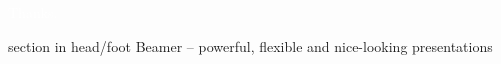\documentclass[aspectratio=1610,utf8]{beamer}
\begin{document}
\addtocounter{framenumber}{-1}


\begin{frame}[plain, b]
  \transsplithorizontalout
  \centering
  \LARGE \textcolor{white}{Thanks.}
  \normalsize

  \vspace*{\fill}

  \begin{beamercolorbox}[wd=\paperwidth]{section in head/foot}
    \centering
    \vskip3pt
    {\small Beamer -- powerful, flexible and nice-looking presentations}
    \vskip8pt
  \end{beamercolorbox}
  
\end{frame}
\end{document}
